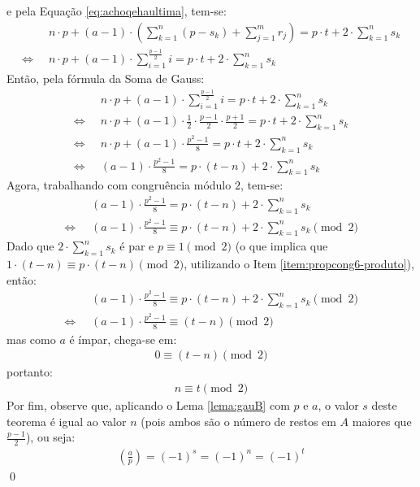 e pela Equação \ref{eq:achoqehaultima}, tem-se:
\begin{align*}
    & n \cdot p  + (a - 1) \cdot \left(\sum_{k = 1}^{n} (p - s_k) + \sum_{j = 1}^{m} r_j \right) = p \cdot t + 2 \cdot \sum_{k = 1}^{n} s_k
    \\
    \Longleftrightarrow \; \;
    & n \cdot p  + (a - 1) \cdot \sum_{i=1}^{\frac{p-1}{2}} i = p \cdot t + 2 \cdot \sum_{k = 1}^{n} s_k
\end{align*}
Então, pela fórmula da Soma de Gauss:
\begin{align*}
    & n \cdot p  + (a - 1) \cdot \sum_{i=1}^{\frac{p-1}{2}} i = p \cdot t + 2 \cdot \sum_{k = 1}^{n} s_k
    \\
    \Longleftrightarrow \; \;
    & n \cdot p  + (a - 1) \cdot \frac{1}{2} \cdot \frac{p-1}{2} \cdot \frac{p+1}{2} = p \cdot t + 2 \cdot \sum_{k = 1}^{n} s_k
    \\
    \Longleftrightarrow \; \;
    & n \cdot p  + (a - 1) \cdot \frac{p^2 - 1}{8} = p \cdot t + 2 \cdot \sum_{k = 1}^{n} s_k
    \\
    \Longleftrightarrow \; \;
    &  (a - 1) \cdot \frac{p^2 - 1}{8} = p \cdot (t - n) + 2 \cdot \sum_{k = 1}^{n} s_k
\end{align*}
Agora, trabalhando com congruência módulo $2$, tem-se:
\begin{align*}
    &  (a - 1) \cdot \frac{p^2 - 1}{8} = p \cdot (t - n) + 2 \cdot \sum_{k = 1}^{n} s_k
    \\
    \Longleftrightarrow \; \;
    &  (a - 1) \cdot \frac{p^2 - 1}{8} \equiv p \cdot (t - n) + 2 \cdot \sum_{k = 1}^{n} s_k \pmod{2}
\end{align*}
Dado que $2 \cdot \sum_{k = 1}^{n} s_k$ é par e $p \equiv 1 \pmod{2}$ (o que implica que $1 \cdot (t-n) \equiv p \cdot (t-n) \pmod{2}$, utilizando o Item \ref{item:propcong6-produto}), então:
\begin{align*}
    &  (a - 1) \cdot \frac{p^2 - 1}{8} \equiv p \cdot (t - n) + 2 \cdot \sum_{k = 1}^{n} s_k \pmod{2}
    \\
    \Longleftrightarrow \; \;
    &  (a - 1) \cdot \frac{p^2 - 1}{8} \equiv (t - n) \pmod{2}
\end{align*}
mas como $a$ é ímpar, chega-se em:
\begin{align*}
    0 \equiv (t - n) \pmod{2}
\end{align*}
portanto:
\begin{align*}
    n \equiv t \pmod{2}
\end{align*}
Por fim, observe que, aplicando o Lema \ref{lema:gauB} com $p$ e $a$, o valor $s$ deste teorema é igual ao valor $n$ (pois ambos são o número de restos em $A$ maiores que $\frac{p-1}{2}$), ou seja:
\begin{align*}
    \left(\frac{a}{p}\right) = (-1)^s = (-1)^n = (-1)^t 
\end{align*} \qed

